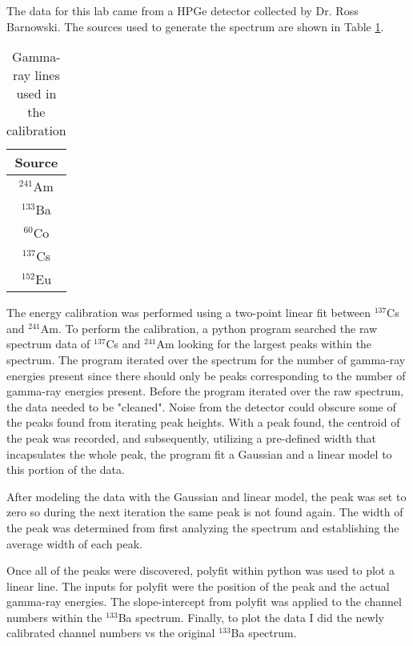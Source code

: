 The data for this lab came from a HPGe detector collected by Dr. Ross Barnowski.
The sources used to generate the spectrum are shown in Table \ref{table:source}.
\vspace{15mm} %
\begin{table}[H]
  \begin{center}
    \begin{tabular}{|c|}
      \textbf{Source}\\
      \hline
      $^{241}$Am\\
      $^{133}$Ba\\
      $^{60}$Co\\
      $^{137}$Cs\\
      $^{152}$Eu\\
      \hline
    \end{tabular}
    \caption{Gamma-ray lines used in the calibration}
    \label{table:source}
  \end{center}
\end{table}

The energy calibration was performed using a two-point linear fit between
$^{137}$Cs and $^{241}$Am. To perform the calibration, a python program searched
the raw spectrum data of $^{137}$Cs and $^{241}$Am looking for
the largest peaks within the spectrum. The program iterated over the spectrum for the
number of gamma-ray energies present since there should only be peaks corresponding
to the number of gamma-ray energies present. Before the program iterated over the raw spectrum,
the data needed to be "cleaned". Noise from the detector could obscure some of the peaks
found from iterating peak heights. With a peak found, the centroid of the peak was
recorded, and subsequently, utilizing a pre-defined width that incapsulates
the whole peak, the program fit a Gaussian and a linear model to this portion of the data.

After modeling the data with the Gaussian and linear model, the peak was
set to zero so during the next iteration the same peak is not found again.
The width of the peak was determined from first analyzing the spectrum and establishing
the average width of each peak.

Once all of the peaks were discovered, polyfit within python was used to
plot a linear line. The inputs for polyfit were the position of the peak and
the actual gamma-ray energies. The slope-intercept from polyfit was applied
to the channel numbers within the $^{133}$Ba spectrum. Finally, to plot the data
I did the newly calibrated channel numbers vs the original $^{133}$Ba spectrum.
